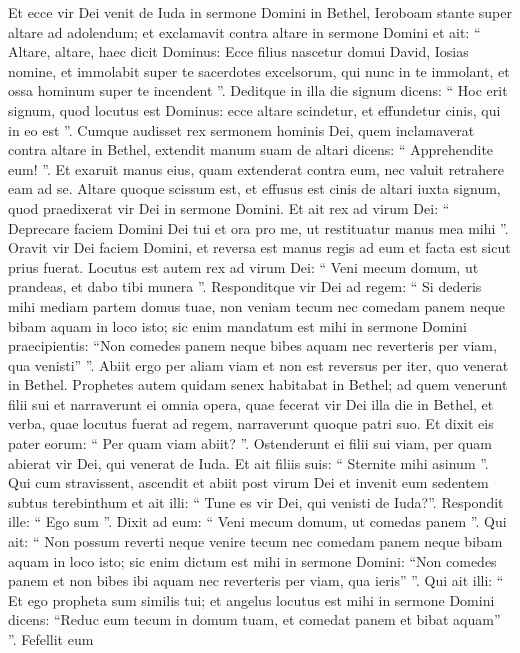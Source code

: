 \begin{biblechapter}
\begin{biblechapter}
\begin{biblechapter}
\begin{biblechapter}
\begin{biblechapter}
\begin{biblechapter}
\begin{biblechapter}
\begin{biblechapter}
\begin{biblechapter}
\begin{biblechapter}
\begin{biblechapter}
\begin{biblechapter}
\begin{biblechapter}
\verse Et ecce vir Dei venit de Iuda in sermone Domini in Bethel, Ieroboam stante super altare ad adolendum; 
\verse et exclamavit contra altare in sermone Domini et ait: “ Altare, altare, haec dicit Dominus: Ecce filius nascetur domui David, Iosias nomine, et immolabit super te sacerdotes excelsorum, qui nunc in te immolant, et ossa hominum super te incendent ”. 
\verse Deditque in illa die signum dicens: “ Hoc erit signum, quod locutus est Dominus: ecce altare scindetur, et effundetur cinis, qui in eo est ”.
 \verse Cumque audisset rex sermonem hominis Dei, quem inclamaverat contra altare in Bethel, extendit manum suam de altari dicens: “ Apprehendite eum! ”. Et exaruit manus eius, quam extenderat contra eum, nec valuit retrahere eam ad se. 
\verse Altare quoque scissum est, et effusus est cinis de altari iuxta signum, quod praedixerat vir Dei in sermone Domini. 
\verse Et ait rex ad virum Dei: “ Deprecare faciem Domini Dei tui et ora pro me, ut restituatur manus mea mihi ”. Oravit vir Dei faciem Domini, et reversa est manus regis ad eum et facta est sicut prius fuerat.
 \verse Locutus est autem rex ad virum Dei: “ Veni mecum domum, ut prandeas, et dabo tibi munera ”. 
\verse Responditque vir Dei ad regem: “ Si dederis mihi mediam partem domus tuae, non veniam tecum nec comedam panem neque bibam aquam in loco isto; 
\verse sic enim mandatum est mihi in sermone Domini praecipientis: “Non comedes panem neque bibes aquam nec reverteris per viam, qua venisti” ”. 
\verse Abiit ergo per aliam viam et non est reversus per iter, quo venerat in Bethel.
 \verse Prophetes autem quidam senex habitabat in Bethel; ad quem venerunt filii sui et narraverunt ei omnia opera, quae fecerat vir Dei illa die in Bethel, et verba, quae locutus fuerat ad regem, narraverunt quoque patri suo. 
\verse Et dixit eis pater eorum: “ Per quam viam abiit? ”. Ostenderunt ei filii sui viam, per quam abierat vir Dei, qui venerat de Iuda. 
\verse Et ait filiis suis: “ Sternite mihi asinum ”. Qui cum stravissent, ascendit 
\verse et abiit post virum Dei et invenit eum sedentem subtus terebinthum et ait illi: “ Tune es vir Dei, qui venisti de Iuda?”. Respondit ille: “ Ego sum ”. 
\verse Dixit ad eum: “ Veni mecum domum, ut comedas panem ”. 
\verse Qui ait: “ Non possum reverti neque venire tecum nec comedam panem neque bibam aquam in loco isto; 
\verse sic enim dictum est mihi in sermone Domini: “Non comedes panem et non bibes ibi aquam nec reverteris per viam, qua ieris” ”. 
\verse Qui ait illi: “ Et ego propheta sum similis tui; et angelus locutus est mihi in sermone Domini dicens: “Reduc eum tecum in domum tuam, et comedat panem et bibat aquam” ”. Fefellit eum 

\end{biblechapter}
\end{biblechapter}
\end{biblechapter}
\end{biblechapter}
\end{biblechapter}
\end{biblechapter}
\end{biblechapter}
\end{biblechapter}
\end{biblechapter}
\end{biblechapter}
\end{biblechapter}
\end{biblechapter}
\end{biblechapter}
